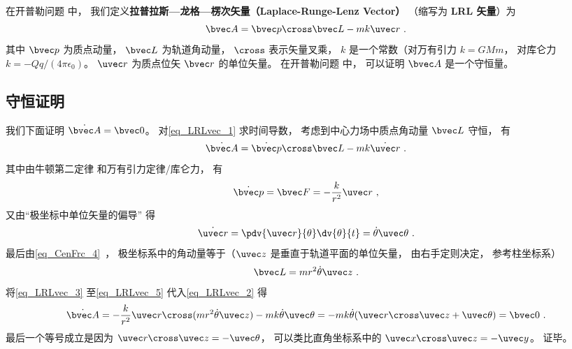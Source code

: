 

在开普勒问题%
中， 我们定义\textbf{拉普拉斯—龙格—楞次矢量（Laplace-Runge-Lenz Vector）} （缩写为 \textbf{LRL 矢量}）为
\begin{equation}\label{eq_LRLvec_1}
\bvec A = \bvec p \cross \bvec L - mk \uvec r~.
\end{equation}
其中 $\bvec p$ 为质点动量， $\bvec L$ 为轨道角动量， $\cross$ 表示矢量叉乘， $k$ 是一个常数（对万有引力 $k = GMm$， 对库仑力 $k = -Qq/(4\pi\epsilon_0)$。 $\uvec r$ 为质点位矢 $\bvec r$ 的单位矢量。 在开普勒问题%
中， 可以证明 $\bvec A$ 是一个守恒量。

\subsection{守恒证明}
我们下面证明 $\dot{\bvec A} = \bvec 0$。 对\autoref{eq_LRLvec_1} 求时间导数， 考虑到中心力场中质点角动量 $\bvec L$ 守恒， 有
\begin{equation}\label{eq_LRLvec_2}
\dot{\bvec A} = \dot{\bvec p}\cross \bvec L  - mk\dot{\uvec r}~.
\end{equation}
其中由牛顿第二定律 和万有引力定律/库仑力， 有
\begin{equation}\label{eq_LRLvec_3}
\dot{\bvec p} = \bvec F = - \frac{k}{r^2}\uvec r~,
\end{equation}
又由“极坐标中单位矢量的偏导” 得
\begin{equation}\label{eq_LRLvec_4}
\dot{\uvec r} = \pdv{\uvec r}{\theta} \dv{\theta}{t} = \dot\theta\uvec \theta~.
\end{equation}
最后由\autoref{eq_CenFrc_4}~， 极坐标系中的角动量等于（$\uvec z$ 是垂直于轨道平面的单位矢量， 由右手定则决定， 参考柱坐标系）
\begin{equation}\label{eq_LRLvec_5}
\bvec L = mr^2\dot \theta \uvec z~.
\end{equation}
将\autoref{eq_LRLvec_3} 至\autoref{eq_LRLvec_5} 代入\autoref{eq_LRLvec_2} 得
\begin{equation}
\dot{\bvec A} = -\frac{k}{r^2}\uvec r \cross (mr^2\dot\theta\uvec z) - mk\dot\theta\uvec\theta
=-mk\dot\theta (\uvec r\cross \uvec z + \uvec \theta)
= \bvec 0~.
\end{equation}
最后一个等号成立是因为 $\uvec r\cross\uvec z = -\uvec\theta$， 可以类比直角坐标系中的 $\uvec x\cross\uvec z = -\uvec y$。 证毕。


